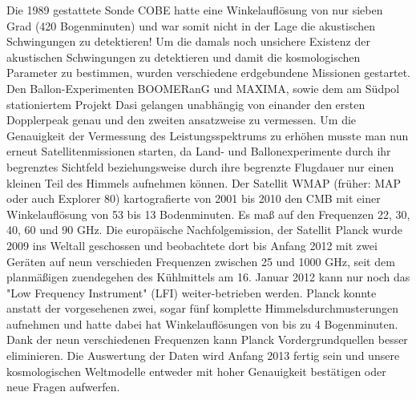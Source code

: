 \documentclass[10pt,a4paper]{article}
\begin{document}
Die 1989 gestattete Sonde COBE hatte eine Winkelauflösung von nur sieben Grad (420 Bogenminuten) und war somit nicht in der Lage die akustischen Schwingungen zu detektieren! Um die damals noch unsichere Existenz der akustischen Schwingungen zu detektieren und damit die kosmologischen Parameter zu bestimmen, wurden verschiedene erdgebundene Missionen gestartet. Den Ballon-Experimenten BOOMERanG und MAXIMA, sowie dem am Südpol stationiertem Projekt Dasi gelangen unabhängig von einander den ersten Dopplerpeak genau und den zweiten ansatzweise zu vermessen. Um die Genauigkeit der Vermessung des Leistungsspektrums zu erhöhen musste man nun erneut Satellitenmissionen starten, da Land- und Ballonexperimente durch ihr begrenztes Sichtfeld beziehungsweise durch ihre begrenzte Flugdauer nur einen kleinen Teil des Himmels aufnehmen können.
Der Satellit WMAP (früher: MAP oder auch Explorer 80) kartografierte von 2001 bis 2010 den CMB mit einer Winkelauflösung von 53 bis 13 Bodenminuten.\cite{PJ1} Es maß auf den Frequenzen 22, 30, 40, 60 und 90 GHz.
Die europäische Nachfolgemission, der Satellit Planck wurde 2009 ins Weltall geschossen und beobachtete dort bis Anfang 2012 mit zwei Geräten auf neun verschieden Frequenzen zwischen 25 und 1000 GHz, seit dem planmäßigen zuendegehen des Kühlmittels am 16. Januar 2012 kann nur noch das "Low Frequency Instrument" (LFI) weiter-betrieben werden\cite{PJ1}\cite{pm}.
Planck konnte anstatt der vorgesehenen zwei, sogar fünf komplette Himmelsdurchmusterungen aufnehmen und hatte dabei hat Winkelauflösungen von bis zu 4 Bogenminuten. %
Dank der neun verschiedenen Frequenzen kann Planck Vordergrundquellen besser eliminieren. Die Auswertung der Daten wird Anfang 2013 fertig sein und unsere kosmologischen Weltmodelle entweder mit hoher Genauigkeit bestätigen oder neue Fragen aufwerfen.

{}

\end{document}

